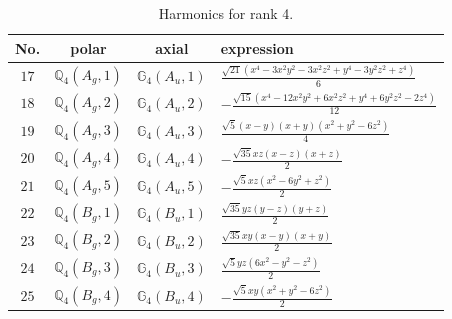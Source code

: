 \documentclass[fleqn,8pt,landscape]{jsarticle}
\begin{document}
\begin{table}[ht!]
\begin{center}
\caption{Harmonics for rank 4.}
\renewcommand{\arraystretch}{1.3}
\begin{tabular}{cccl} \hline \hline
No. & polar & axial & expression \\ \hline
$ 17 $ & $ \mathbb{Q}_{4}(A_{g},1) $ & $ \mathbb{G}_{4}(A_{u},1) $ & $ \frac{\sqrt{21} \left(x^{4} - 3 x^{2} y^{2} - 3 x^{2} z^{2} + y^{4} - 3 y^{2} z^{2} + z^{4}\right)}{6} $ \\
$ 18 $ & $ \mathbb{Q}_{4}(A_{g},2) $ & $ \mathbb{G}_{4}(A_{u},2) $ & $ - \frac{\sqrt{15} \left(x^{4} - 12 x^{2} y^{2} + 6 x^{2} z^{2} + y^{4} + 6 y^{2} z^{2} - 2 z^{4}\right)}{12} $ \\
$ 19 $ & $ \mathbb{Q}_{4}(A_{g},3) $ & $ \mathbb{G}_{4}(A_{u},3) $ & $ \frac{\sqrt{5} \left(x - y\right) \left(x + y\right) \left(x^{2} + y^{2} - 6 z^{2}\right)}{4} $ \\
$ 20 $ & $ \mathbb{Q}_{4}(A_{g},4) $ & $ \mathbb{G}_{4}(A_{u},4) $ & $ - \frac{\sqrt{35} x z \left(x - z\right) \left(x + z\right)}{2} $ \\
$ 21 $ & $ \mathbb{Q}_{4}(A_{g},5) $ & $ \mathbb{G}_{4}(A_{u},5) $ & $ - \frac{\sqrt{5} x z \left(x^{2} - 6 y^{2} + z^{2}\right)}{2} $ \\
$ 22 $ & $ \mathbb{Q}_{4}(B_{g},1) $ & $ \mathbb{G}_{4}(B_{u},1) $ & $ \frac{\sqrt{35} y z \left(y - z\right) \left(y + z\right)}{2} $ \\
$ 23 $ & $ \mathbb{Q}_{4}(B_{g},2) $ & $ \mathbb{G}_{4}(B_{u},2) $ & $ \frac{\sqrt{35} x y \left(x - y\right) \left(x + y\right)}{2} $ \\
$ 24 $ & $ \mathbb{Q}_{4}(B_{g},3) $ & $ \mathbb{G}_{4}(B_{u},3) $ & $ \frac{\sqrt{5} y z \left(6 x^{2} - y^{2} - z^{2}\right)}{2} $ \\
$ 25 $ & $ \mathbb{Q}_{4}(B_{g},4) $ & $ \mathbb{G}_{4}(B_{u},4) $ & $ - \frac{\sqrt{5} x y \left(x^{2} + y^{2} - 6 z^{2}\right)}{2} $ \\
 \hline \hline
\end{tabular}
\end{center}
\end{table}
\end{document}
